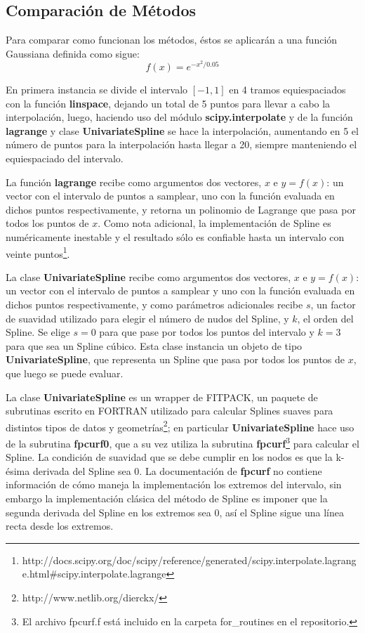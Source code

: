\documentclass[a4paper, 11pt, spanish]{article}
\begin{document}
\subsection{Comparaci\'on de M\'etodos}
Para comparar como funcionan los m\'etodos, \'estos se aplicar\'an a una funci\'on Gaussiana definida como sigue:
\begin{equation}
	f(x) = e^{-x^{2}/0.05}
\end{equation}

En primera instancia se divide el intervalo $[-1,1]$ en 4 tramos equiespaciados con la funci\'on \textbf{linspace}, dejando un total de 5 puntos para llevar a cabo la interpolaci\'on, luego, haciendo uso del m\'odulo \textbf{scipy.interpolate} y de la funci\'on \textbf{lagrange} y clase \textbf{UnivariateSpline} se hace la interpolaci\'on, aumentando en 5 el n\'umero de puntos para la interpolaci\'on hasta llegar a 20, siempre manteniendo el equiespaciado del intervalo.

La funci\'on \textbf{lagrange} recibe como argumentos dos vectores, $x$ e $y = f(x)$: un vector con el intervalo de puntos a samplear, uno con la funci\'on evaluada en dichos puntos respectivamente, y retorna un polinomio de Lagrange que pasa por todos los puntos de $x$. Como nota adicional, la implementaci\'on de Spline es num\'ericamente inestable y el resultado s\'olo es confiable hasta un intervalo con veinte puntos\footnote{http://docs.scipy.org/doc/scipy/reference/generated/scipy.interpolate.lagrange.html\#scipy.interpolate.lagrange}.

La clase \textbf{UnivariateSpline} recibe como argumentos dos vectores, $x$ e $y = f(x)$: un vector con el intervalo de puntos a samplear y uno con la funci\'on evaluada en dichos puntos respectivamente, y como par\'ametros adicionales recibe $s$, un factor de suavidad utilizado para elegir el n\'umero de nudos del Spline, y $k$, el orden del Spline. Se elige $s=0$ para que pase por todos los puntos del intervalo y $k=3$ para que sea un Spline c\'ubico. Esta clase instancia un objeto de tipo \textbf{UnivariateSpline}, que representa un Spline que pasa por todos los puntos de $x$, que luego se puede evaluar.

La clase \textbf{UnivariateSpline} es un wrapper de FITPACK, un paquete de subrutinas escrito en FORTRAN utilizado para calcular Splines suaves para distintos tipos de datos y geometr\'ias\footnote{http://www.netlib.org/dierckx/}; en particular \textbf{UnivariateSpline} hace uso de la subrutina \textbf{fpcurf0}, que a su vez utiliza la subrutina \textbf{fpcurf}\footnote{El archivo fpcurf.f est\'a incluido en la carpeta for\_routines en el repositorio.} para calcular el Spline.
La condici\'on de suavidad que se debe cumplir en los nodos es que la k-\'esima derivada del Spline sea 0. La documentaci\'on de \textbf{fpcurf} no contiene informaci\'on de c\'omo maneja la implementaci\'on los extremos del intervalo, sin embargo la implementaci\'on cl\'asica del m\'etodo de Spline es imponer que la segunda derivada del Spline en los extremos sea 0, as\'i el Spline sigue una l\'inea recta desde los extremos.
\end{document}
